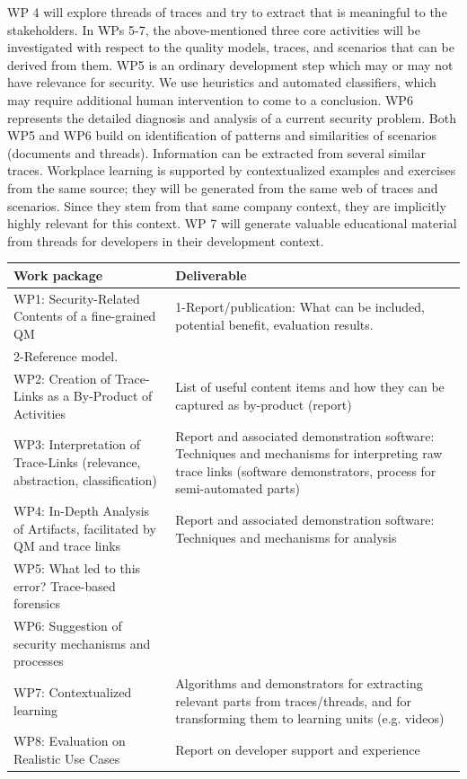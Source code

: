 WP 4 will explore threads of traces and try to extract that is meaningful to the stakeholders. In WPs 5-7, the above-mentioned three core activities will be investigated with respect to the quality models, traces, and scenarios that can be derived from them. WP5 is an ordinary development step which may or may not have relevance for security. We use heuristics and automated classifiers, which may require additional human intervention to come to a conclusion. WP6 represents the detailed diagnosis and analysis of a current security problem. Both WP5 and WP6 build on identification of patterns and similarities of scenarios (documents and threads). Information can be extracted from several similar traces. Workplace learning is supported by contextualized examples and exercises from the same source; they will be generated from the same web of traces and scenarios. Since they stem from that same company context, they are implicitly highly relevant for this context. WP 7 will generate valuable educational material from threads for developers in their development context.

\begin{tabular}{|p{6cm}|p{10cm}|}
	\hline 
	\textbf{Work package} & \textbf{Deliverable} \\ 
	\hline 
	WP1: Security-Related Contents of a fine-grained QM & 1-Report/publication: What can be included, potential benefit, evaluation results.\\
	2-Reference model. \\ 
	\hline 
	WP2: Creation of Trace-Links as a By-Product of Activities & List of useful content items and how they can be captured as by-product (report) \\ 
	\hline 
	WP3: Interpretation of Trace-Links (relevance, abstraction, classification) & Report and associated demonstration software: Techniques and mechanisms for interpreting raw trace links (software demonstrators, process for semi-automated parts) \\ 
	\hline 
	WP4: In-Depth Analysis of Artifacts, facilitated by QM and trace links & Report and associated demonstration software: Techniques and mechanisms for analysis \\ 
	\hline 
	WP5: What led to this error? Trace-based forensics &  \\ 
	\hline 
	WP6: Suggestion of security mechanisms and processes &  \\ 
	\hline 
	WP7: Contextualized learning & Algorithms and demonstrators for extracting relevant parts from traces/threads, and for transforming them to learning units (e.g. videos) \\ 
	\hline 
	WP8: Evaluation on Realistic Use Cases & Report on developer support and experience \\ 
	\hline 
\end{tabular} 

